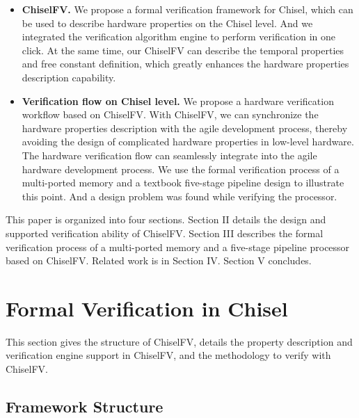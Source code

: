 \documentclass[conference]{IEEEtran}
\theoremstyle{definition}
\begin{document}
\begin{itemize}
    \item \textbf{ChiselFV.} We propose a formal verification framework for Chisel, which can be used to describe hardware properties on the Chisel level. And we integrated the verification algorithm engine to perform verification in one click. At the same time, our ChiselFV can describe the temporal properties and free constant definition, which greatly enhances the hardware properties description capability.
    \item \textbf{Verification flow on Chisel level.} We propose a hardware verification workflow based on ChiselFV. With ChiselFV, we can synchronize the hardware properties description with the agile development process, thereby avoiding the design of complicated hardware properties in low-level hardware. The hardware verification flow can seamlessly integrate into the agile hardware development process. 
    We use the formal verification process of a multi-ported memory and a textbook five-stage pipeline design to illustrate this point.
    And a design problem was found while verifying the processor.
\end{itemize}

This paper is organized into four sections. 
Section II details the design and supported verification ability of ChiselFV.
Section III describes the formal verification process of a multi-ported memory and a five-stage pipeline processor based on ChiselFV.
Related work is in Section IV. Section V concludes.

\section{Formal Verification in Chisel}

This section gives the structure of ChiselFV, details the property description and verification engine support in ChiselFV, and the methodology to verify with ChiselFV.

\subsection{Framework Structure}
\end{document}
